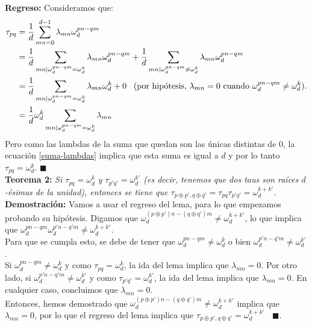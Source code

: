 \textbf{Regreso:} Consideramos que:
\begin{align*}
\tau_{pq}& = \dfrac{1}{d} \sum_{mn=0}^{d-1} \lambda_{mn} \omega_d^{pn-qm} \\
&= \dfrac{1}{d} \sum_{mn | \omega_d^{pn-qm} = \omega_d^k} \lambda_{mn} \omega_d^{pn-qm} +\dfrac{1}{d} \sum_{mn | \omega_d^{pn-qm} \neq \omega_d^k} \lambda_{mn} \omega_d^{pn-qm} \\
& = \dfrac{1}{d} \sum_{mn | \omega_d^{pn-qm} = \omega_d^k} \lambda_{mn} \omega_d^k + 0 \;\;\; \text{(por hipótesis, $ \lambda_{mn} = 0$ cuando $ \omega_d^{pn-qm} \neq \omega_d^k)$.} \\
& =  \dfrac{1}{d} \omega_d^k \sum_{mn | \omega_d^{pn-qm} = \omega_d^k} \lambda_{mn}
\end{align*}
Pero como las lambdas de la suma que quedan son las únicas distintas de $0$, la ecuación \ref{suma-lambdas} implica que esta suma es igual a $d$ y por lo tanto $\tau_{pq} = \omega_d^k$. $\blacksquare$ \\

\textbf{Teorema 2:}  \textit{Si $\tau_{pq} = \omega_d^k$ y $\tau_{p'q'} = \omega_d^{k'}$ (es decir, tenemos que dos taus son raíces $d$-ésimas de la unidad), entonces se tiene que $\tau_{p \oplus p' , q \oplus q'} = \tau_{pq} \tau_{p'q'} = \omega_d^{k+k'}$.} \\

\textbf{Demostración:} Vamos a usar el regreso del lema, para lo que empezamos probando su hip\'otesis. Digamos que $\omega_d^{(p \oplus p') n - (q \oplus q')m} \neq \omega_d^{k+k'}$, lo que implica que $\omega_d^{p n - qm} \omega_d^{p'n - q'm} \neq \omega_d^{k+k'}$. \\
Para que se cumpla esto, se debe de tener que $ \omega_d^{p n - qm} \neq \omega_d^k$ o bien $\omega_d^{p'n-q'm} \neq \omega_d^{k'}$. \\

Si $\omega_d^{p n - qm} \neq \omega_d^k$ y como $\tau_{pq} = \omega_d^k$, la ida del lema implica que $\lambda_{mn} =0$. Por otro lado, si $\omega_d^{p'n-q'm} \neq \omega_d^{k'}$ y como $\tau_{p'q'} = \omega_d^{k'}$, la ida del lema implica que $\lambda_{mn} = 0$. En cualquier caso, concluimos que $\lambda_{mn} = 0$. \\

Entonces, hemos demostrado que $\omega_d^{(p \oplus p')n - (q\oplus q')m} \neq \omega_d^{k+k'}$ implica que $\lambda_{mn} = 0$, por lo que el regreso del lema implica que $\tau_{p \oplus p', q \oplus q'} = \omega_d^{k+k'}$ $\;\; \blacksquare$. \\

